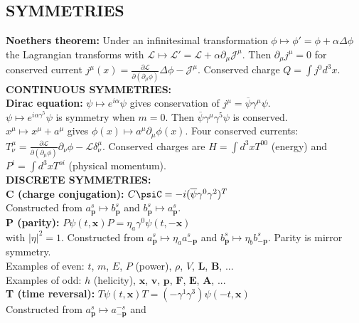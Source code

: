 \documentclass[a4paper, norsk, 8pt, landscape]{article}
\begin{document}
\begin{multicols*}{3}
\subsection*{\footnotesize  SYMMETRIES}
 {\textbf{Noethers theorem:}}
Under an infinitesimal transformation $\phi \mapsto \phi'=\phi+\alpha \Delta \phi$ the
Lagrangian transforms with $\mathcal{L}\mapsto \mathcal{L}'=\mathcal{L}+\alpha \partial_\mu \mathcal{J}^\mu$.
Then $\partial_\mu j^\mu=0$ for conserved current $j^\mu(x)=\frac{\partial\mathcal{L}}{\partial(\partial_\mu\phi)} \Delta \phi - \mathcal{J}^\mu$.
Conserved charge $Q=\int j^0 d^3 x$.
\\
 {\textbf{CONTINUOUS SYMMETRIES:}} \\
 {\textbf{Dirac equation:}}
$\psi \mapsto e^{i\alpha}\psi$ gives conservation of $j^\mu = \overline{\psi}\gamma^\mu\psi$. \\
$\psi \mapsto e^{i\alpha\gamma^5}\psi$ is symmetry when $m=0$. Then $\overline{\psi}\gamma^\mu \gamma^5 \psi$ is conserved. \\
$x^\mu \mapsto x^\mu + a^\mu$ gives $\phi(x) \mapsto a^\mu \partial_\mu \phi(x)$. Four conserved currents:
$T_\nu^\mu = \frac{\partial \mathcal{L}}{\partial (\partial_\mu \phi)} \partial_\nu \phi - \mathcal{L}\delta_\nu^\mu$.
Conserved charges are $H = \int d^3 x T^{00} $ (energy) and $P^i = \int d^3 x T^{oi}$ (physical momentum).
\\
 {\textbf{DISCRETE SYMMETRIES:}} \\
 {\textbf{C (charge conjugation):}} $C\psiC=-i(\overline{\psi}\gamma^0 \gamma^2)^T$ \\
Constructed from $a_\mathbf{p}^s \mapsto b_{\mathbf{p}}^s$ and
$b_\mathbf{p}^s \mapsto a_{\mathbf{p}}^s$.
\\
 {\textbf{P (parity):}} $P\psi(t,\mathbf{x}) P = \eta_a \gamma^0 \psi(t,-\mathbf{x})$ \\
with $|\eta|^2=1$. Constructed from $a_\mathbf{p}^s \mapsto \eta_a a_{-\mathbf{p}}^s$ and
$b_\mathbf{p}^s \mapsto \eta_b b_{-\mathbf{p}}^s$. Parity is mirror symmetry.
\\
Examples of even:
$t$, $m$, $E$, $P$ (power), $\rho$, $V$, $\mathbf{L}$, $\mathbf{B}$, ... \\
Examples of odd:
$h$ (helicity), $\mathbf{x}$, $\mathbf{v}$, $\mathbf{p}$, $\mathbf{F}$, $\mathbf{E}$, $\mathbf{A}$, ...
\\
 {\textbf{T (time reversal):}} $T\psi(t,\mathbf{x})T=(-\gamma^1 \gamma^3)\psi(-t,\mathbf{x})$ \\
Constructed from $a_\mathbf{p}^s \mapsto a_{-\mathbf{p}}^{-s}$ and

\end{multicols*}
\end{document}
